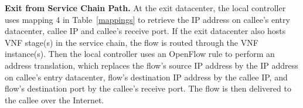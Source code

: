 





\vspace{1mm}
\noindent\textbf{Exit from Service Chain Path.}
At the exit datacenter, the local controller uses mapping 4 in Table~\ref{mappings} to retrieve the IP address on callee's entry datacenter, callee IP and callee's receive port. If the exit datacenter also hosts VNF stage(s) in the service chain, the flow is routed through the VNF instance(s). %
Then the local controller uses an OpenFlow rule to perform an address translation, which replaces the flow's source IP address by the IP address on callee's entry datacenter, flow's destination IP address by the callee IP, and flow's destination port by the callee's receive port. The flow is then delivered to the callee over the Internet.

